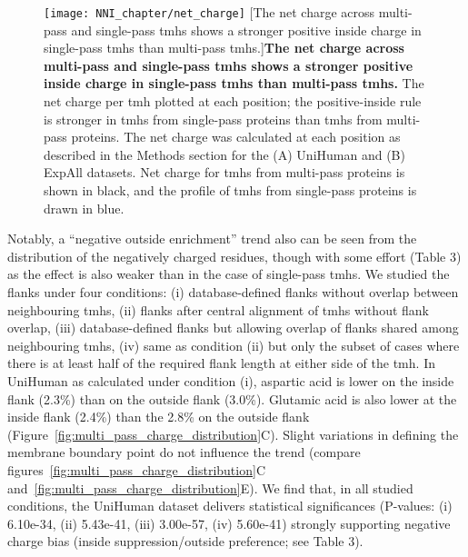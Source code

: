 \begin{figure}[!ht]
\centering
\texttt{[image: NNI\_chapter/net\_charge]}
[The net charge across multi-pass and single-pass \gls{tmh}s shows a stronger positive inside charge in single-pass \gls{tmh}s than multi-pass \gls{tmh}s.]{\textbf{The net charge across multi-pass and single-pass \gls{tmh}s shows a stronger positive inside charge in single-pass \gls{tmh}s than multi-pass \gls{tmh}s.}
The net charge per \gls{tmh} plotted at each position; the positive-inside rule is stronger in \gls{tmh}s from single-pass proteins than \gls{tmh}s from multi-pass proteins.
The net charge was calculated at each position as described in the Methods section for the (A) UniHuman and (B) ExpAll datasets.
Net charge for \gls{tmh}s from multi-pass proteins is shown in black, and the profile of \gls{tmh}s from single-pass proteins is drawn in blue.}

\label{fig:net_charge}
\end{figure}

Notably, a ``negative outside enrichment'' trend also can be seen from the distribution of the negatively charged residues, though with some effort (Table 3) as the effect is also weaker than in the case of single-pass \gls{tmh}s.
We studied the flanks under four conditions: (i) database-defined flanks without overlap between neighbouring \gls{tmh}s, (ii) flanks after central alignment of \gls{tmh}s without flank overlap, (iii) database-defined flanks but allowing overlap of flanks shared among neighbouring \gls{tmh}s, (iv) same as condition (ii) but only the subset of cases where there is at least half of the required flank length at either side of the \gls{tmh}.
In UniHuman as calculated under condition (i), aspartic acid is lower on the inside flank (2.3\%) than on the outside flank (3.0\%).
Glutamic acid is also lower at the inside flank (2.4\%) than the 2.8\% on the outside flank (Figure~\ref{fig:multi_pass_charge_distribution}C).
Slight variations in defining the membrane boundary point do not influence the trend (compare figures~\ref{fig:multi_pass_charge_distribution}C and~\ref{fig:multi_pass_charge_distribution}E).
We find that, in all studied conditions, the UniHuman dataset delivers statistical significances (P-values: (i) 6.10e-34, (ii) 5.43e-41, (iii) 3.00e-57, (iv) 5.60e-41) strongly supporting negative charge bias (inside suppression/outside preference; see Table 3).

